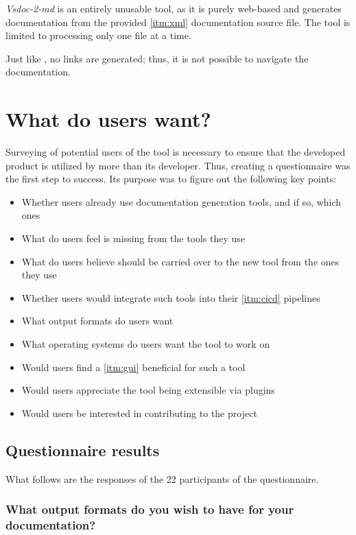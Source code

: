 \textit{Vsdoc-2-md} is an entirely unusable tool, as it is purely web-based and generates documentation from the provided \ref{itm:xml} documentation source file. The tool is limited to processing only one file at a time.

Just like \textit{}, no links are generated; thus, it is not possible to navigate the documentation.

\newpage

\section{What do users want?} \label{sec:whatdouserswant}
Surveying of potential users of the tool is necessary to ensure that the developed product is utilized by more than its developer.
Thus, creating a questionnaire was the first step to success. Its purpose was to figure out the following key points:
\begin{itemize}
    \item Whether users already use documentation generation tools, and if so, which ones
    \item What do users feel is missing from the tools they use
    \item What do users believe should be carried over to the new tool from the ones they use
    \item Whether users would integrate such tools into their \ref{itm:cicd} pipelines
    \item What output formats do users want
    \item What operating systems do users want the tool to work on
    \item Would users find a \ref{itm:gui} beneficial for such a tool
    \item Would users appreciate the tool being extensible via plugins
    \item Would users be interested in contributing to the project
\end{itemize}

\subsection{Questionnaire results}

What follows are the responses of the 22 participants of the questionnaire.

\subsubsection*{What output formats do you wish to have for your documentation?}

